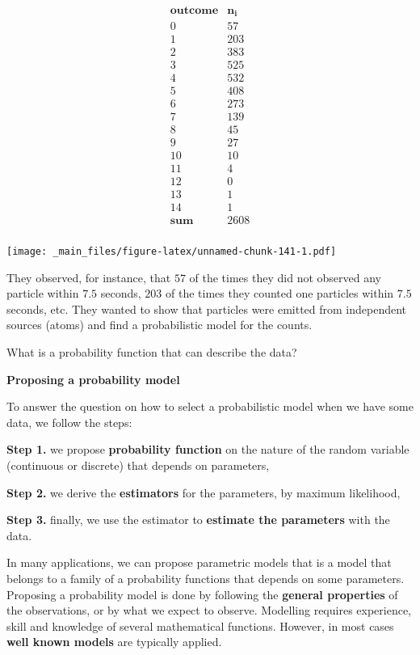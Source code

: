 \documentclass[
]{book}
\begin{document}
\[
\begin{array}{cc}
\mathbf{outcome} & \mathbf{n_i}  \\
0 & 57 \\
1 & 203 \\
2 & 383 \\
3 & 525 \\
4 & 532 \\
5 & 408 \\
6 & 273 \\
7 & 139 \\
8 & 45 \\
9 & 27 \\
10 &  10 \\
11 &   4 \\
12 &   0 \\
13 &   1 \\
14 &   1 \\ \hline
\mathbf{sum} & 2608 \\
\end{array}
\]

\texttt{[image: \_main\_files/figure-latex/unnamed-chunk-141-1.pdf]}

They observed, for instance, that \(57\) of the times they did not observed any particle within \(7.5\) seconds, \(203\) of the times they counted one particles within \(7.5\) seconds, etc. They wanted to show that particles were emitted from independent sources (atoms) and find a probabilistic model for the counts.

What is a probability function that can describe the data?

\textbf{Proposing a probability model}

To answer the question on how to select a probabilistic model when we have some data, we follow the steps:

\textbf{Step 1.} we propose \textbf{probability function} on the nature of the random variable (continuous or discrete) that depends on parameters,

\textbf{Step 2.} we derive the \textbf{estimators} for the parameters, by maximum likelihood,

\textbf{Step 3.} finally, we use the estimator to \textbf{estimate the parameters} with the data.

In many applications, we can propose parametric models that is a model that belongs to a family of a probability functions that depends on some parameters. Proposing a probability model is done by following the \textbf{general properties} of the observations, or by what we expect to observe. Modelling requires experience, skill and knowledge of several mathematical functions. However, in most cases \textbf{well known models} are typically applied.
\end{document}
